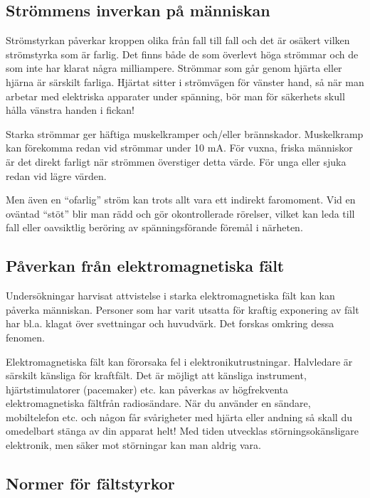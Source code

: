 \subsection{Strömmens inverkan på människan}

Strömstyrkan påverkar kroppen olika från fall till fall och det är
osäkert vilken strömstyrka som är farlig. Det finns både de som
överlevt höga strömmar och de som inte har klarat några
milliampere. Strömmar som går genom hjärta eller hjärna är särskilt
farliga.  Hjärtat sitter i strömvägen för vänster hand, så när man
arbetar med elektriska apparater under spänning, bör man för säkerhets
skull hålla vänstra handen i fickan!

Starka strömmar ger häftiga muskelkramper och/eller
brännskador. Muskelkramp kan förekomma redan vid strömmar under 10
mA. För vuxna, friska människor är det direkt farligt när strömmen
överstiger detta värde.  För unga eller sjuka redan vid lägre värden.

Men även en ``ofarlig'' ström kan trots allt vara ett indirekt
faromoment. Vid en oväntad ``stöt'' blir man rädd och gör okontrollerade
rörelser, vilket kan leda till fall eller oavsiktlig beröring av
spänningsförande föremål i närheten.

\subsection{Påverkan från elektromagnetiska fält}

Undersökningar harvisat attvistelse i starka elektromagnetiska fält
kan kan påverka människan. Personer som har varit utsatta för kraftig
exponering av fält har bl.a. klagat över svettningar och
huvudvärk. Det forskas omkring dessa fenomen.

Elektromagnetiska fält kan förorsaka fel i
elektronikutrustningar. Halvledare är särskilt känsliga för
kraftfält. Det är möjligt att känsliga instrument, hjärtstimulatorer
(pacemaker) etc. kan påverkas av högfrekventa elektromagnetiska
fältfrån radiosändare. När du använder en sändare, mobiltelefon etc.
och någon får svårigheter med hjärta eller andning så skall du
omedelbart stänga av din apparat helt! Med tiden utvecklas
störningsokänsligare elektronik, men säker mot störningar kan man
aldrig vara.

\subsection{Normer för fältstyrkor}

